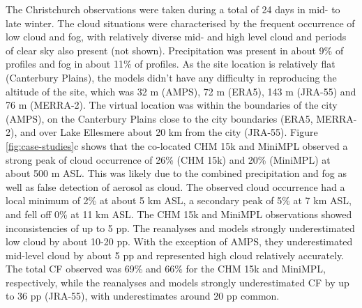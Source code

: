 The Christchurch observations were taken during a total of 24 days in mid-
to late winter. The cloud situations were characterised by the frequent occurrence of low cloud
and fog, with relatively diverse mid- and high level cloud and periods of clear
sky also present (not shown). Precipitation was present in about 9\% of profiles and fog
in about 11\% of profiles. As the site location is relatively flat
(Canterbury Plains), the models didn't have any difficulty in reproducing the
altitude of the site, which was 32 m (AMPS), 72 m (ERA5), 143 m (JRA-55) and
76 m (MERRA-2). The virtual location was within the boundaries of the city
(AMPS), on the Canterbury Plains close to the city boundaries (ERA5, MERRA-2),
and over Lake Ellesmere about 20 km from the city (JRA-55).
Figure \ref{fig:case-studies}c shows that the co-located CHM 15k and MiniMPL
observed a strong peak of cloud occurrence of 26\% (CHM 15k) and 20\% (MiniMPL) at about 500 m ASL. This was
likely due to the combined precipitation and fog as well as false detection
of aerosol as cloud. The observed cloud occurrence
had a local minimum of 2\% at about 5 km ASL, a secondary peak of
5\% at 7 km ASL, and fell off 0\% at 11 km ASL.
The CHM 15k and MiniMPL observations showed inconsistencies
of up to 5 pp. The reanalyses and
models strongly underestimated low cloud by about 10-20 pp. With the
exception of AMPS, they underestimated mid-level cloud by about 5 pp and
represented high cloud relatively accurately.
The total CF observed was 69\% and 66\% for the
CHM 15k and MiniMPL, respectively, while the reanalyses and models strongly
underestimated CF by up to 36 pp (JRA-55), with
underestimates around 20 pp common.

